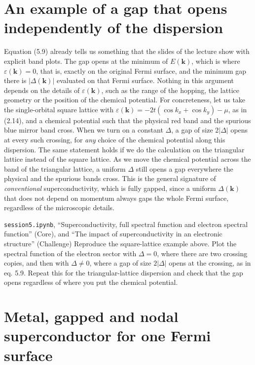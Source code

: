 \section{An example of a gap that opens independently of the dispersion}

Equation (5.9) already tells us something that the slides of the lecture show with explicit band
plots. The gap opens at the minimum of $E(\mathbf k)$, which is where $\varepsilon(\mathbf
k) = 0$, that is, exactly on the original Fermi surface, and the minimum gap there is
$|\Delta(\mathbf
k)|$ evaluated on that Fermi surface. Nothing in this argument depends on the details of
$\varepsilon(\mathbf k)$, such as the range of the hopping, the lattice geometry or the position of
the chemical potential. For concreteness, let us take the single-orbital square lattice with
$\varepsilon(\mathbf k) = -2t\left(\cos k_x + \cos k_y\right) - \mu$, as in (2.14), and a chemical potential such that the physical red band
and the spurious blue mirror band cross. When we turn on a constant $\Delta$, a gap of size
$2|\Delta|$ opens at every such crossing, for \emph{any} choice of the chemical potential along this
dispersion. The same statement holds if we do the calculation on the triangular lattice instead of
the square lattice. As we move the chemical potential across the band of the triangular lattice, a
uniform $\Delta$ still opens a gap everywhere the physical and the spurious bands cross. This is the
general signature of \emph{conventional} superconductivity, which is fully gapped, since a uniform
$\Delta(\mathbf k)$ that does not depend on momentum always gaps the whole Fermi surface,
regardless of the microscopic details.

\begin{notebookbox}{\texttt{session5.ipynb}, ``Superconductivity, full spectral function and electron spectral function'' (Core), and ``The impact of superconductivity in an electronic structure'' (Challenge)}
Reproduce the square-lattice example above. Plot the spectral function of the electron sector with
$\Delta = 0$, where there are two crossing copies, and then with $\Delta \ne 0$, where a gap of size
$2|\Delta|$ opens at the crossing, as in eq. 5.9. Repeat this for the triangular-lattice dispersion
and check that the gap opens regardless of where you put the chemical potential.
\end{notebookbox}

\section{Metal, gapped and nodal superconductor for one Fermi surface}


